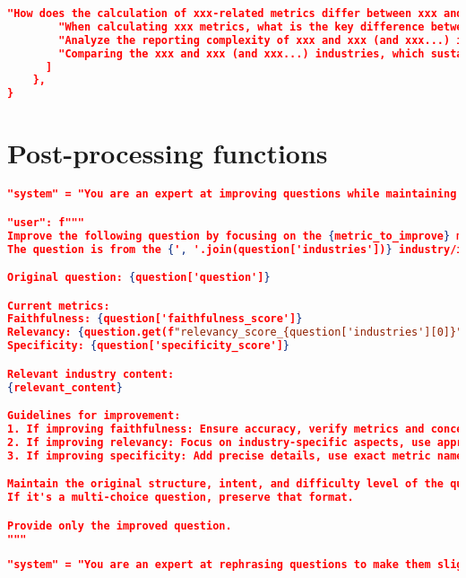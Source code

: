 \begin{appendices}
\begin{lstlisting}[language=json,firstnumber=1,label={lst:qa_structures},caption={User-representative sample questions for `CoT + Few-shot' question generation}]
        "How does the calculation of xxx-related metrics differ between xxx and xxx (and xxx...) companies?",
        "When calculating xxx metrics, what is the key difference between xxx and and xxx (and xxx...) companies?",
        "Analyze the reporting complexity of xxx and xxx (and xxx...) industries by comparing the number of required metrics and the diversity of measurement units used",
        "Comparing the xxx and xxx (and xxx...) industries, which sustainability topic is more prominently addressed in the xxx industry but not explicitly covered for xxx industry?"
      ]
    },
}
\end{lstlisting}
\newpage
\section{Post-processing functions}

\begin{lstlisting}[language=json,firstnumber=1,label={lst:quality_improvement_prompt},caption={Quality improvement function prompt}]
"system" = "You are an expert at improving questions while maintaining their core meaning and structure."

"user": f"""
Improve the following question by focusing on the {metric_to_improve} metric. 
The question is from the {', '.join(question['industries'])} industry/industries.

Original question: {question['question']}

Current metrics:
Faithfulness: {question['faithfulness_score']}
Relevancy: {question.get(f"relevancy_score_{question['industries'][0]}", 'N/A')}
Specificity: {question['specificity_score']}

Relevant industry content:
{relevant_content}

Guidelines for improvement:
1. If improving faithfulness: Ensure accuracy, verify metrics and concepts, remove misleading information.
2. If improving relevancy: Focus on industry-specific aspects, use appropriate terminology.
3. If improving specificity: Add precise details, use exact metric names or values, narrow the scope if needed.

Maintain the original structure, intent, and difficulty level of the question.
If it's a multi-choice question, preserve that format.

Provide only the improved question.
"""
\end{lstlisting}
\newpage
\begin{lstlisting}[language=json,firstnumber=1,label={lst:generalisation_prompt},caption={Generalisation function prompt}]
"system" = "You are an expert at rephrasing questions to make them slightly more vague while maintaining their core meaning."


\end{lstlisting}
\end{appendices}
